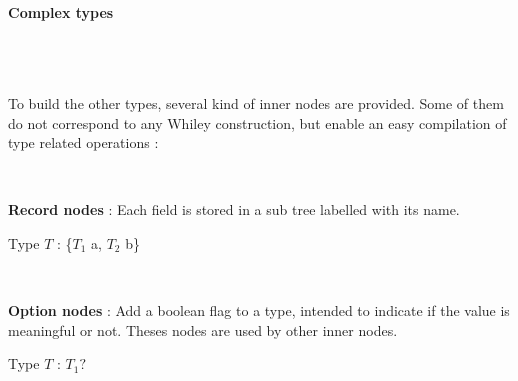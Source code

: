 \documentclass[10pt,a4paper]{article}
\renewcommand{\indent}{~\\\vspace{-.8cm}}
\begin{document}
\paragraph{Complex types}~\\\indent


To build the other types, several kind of inner nodes are provided. Some of them do not correspond to any Whiley construction, but enable an easy compilation of type related operations :

\newlength{\pict}
\setlength{\pict}{.22\textwidth}

\begin{itemize}
	\item[] 
	\begin{minipage}[b]{.95\textwidth}
		\begin{figure}
		\end{figure}
		~%
		\item \textbf{Record nodes} : Each field is stored in a sub tree labelled with its name.
		\begin{flushright}
			Type $T$ : {\{$T_1$ a, $T_2$ b\}}
		\end{flushright}
	\end{minipage} 
	
	\item[] 
	\begin{minipage}[b]{.95\textwidth}
		\begin{figure}
		\end{figure}
		~%
		\item \textbf{Option nodes} : Add a boolean flag to a type, intended to indicate if the value is meaningful or not. Theses nodes are used by other inner nodes.
		\begin{flushright}
			Type $T$ : $T_1?$
		\end{flushright}
	\end{minipage} 
	

\end{itemize}
\end{document}
